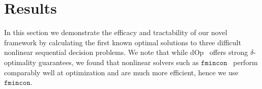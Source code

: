 \section{Results}
\label{sec:results}

In this section we demonstrate the efficacy and tractability of our novel framework by calculating the first known optimal solutions to three difficult nonlinear sequential decision problems.
We note that while dOp~\parencite{Gao2013} offers strong {\footnotesize $ \delta $}-optimality guarantees, we found that nonlinear solvers such as $ \mathtt{fmincon} $~\parencite{MATLAB_2010} perform comparably well at optimization and are much more efficient, hence we use $ \mathtt{fmincon} $.

